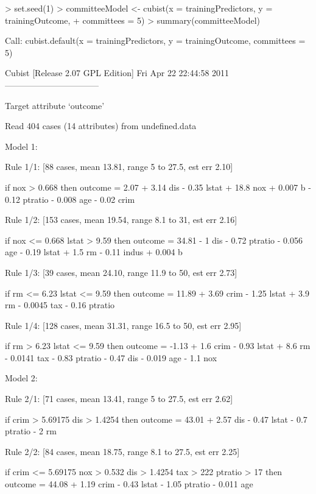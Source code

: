 \documentclass[12pt]{article}
\renewenvironment{Schunk}{\vspace{\topsep}}{\vspace{\topsep}}
\begin{document}
\begin{Schunk}
\begin{Sinput}
> set.seed(1)
> committeeModel <- cubist(x = trainingPredictors, y = trainingOutcome,
+                          committees = 5)
> summary(committeeModel)
\end{Sinput}
\begin{Soutput}
Call:
cubist.default(x = trainingPredictors, y = trainingOutcome, committees = 5)


Cubist [Release 2.07 GPL Edition]  Fri Apr 22 22:44:58 2011
---------------------------------

    Target attribute `outcome'

Read 404 cases (14 attributes) from undefined.data

Model 1:

  Rule 1/1: [88 cases, mean 13.81, range 5 to 27.5, est err 2.10]

    if
	nox > 0.668
    then
	outcome = 2.07 + 3.14 dis - 0.35 lstat + 18.8 nox + 0.007 b
	          - 0.12 ptratio - 0.008 age - 0.02 crim

  Rule 1/2: [153 cases, mean 19.54, range 8.1 to 31, est err 2.16]

    if
	nox <= 0.668
	lstat > 9.59
    then
	outcome = 34.81 - 1 dis - 0.72 ptratio - 0.056 age - 0.19 lstat + 1.5 rm
	          - 0.11 indus + 0.004 b

  Rule 1/3: [39 cases, mean 24.10, range 11.9 to 50, est err 2.73]

    if
	rm <= 6.23
	lstat <= 9.59
    then
	outcome = 11.89 + 3.69 crim - 1.25 lstat + 3.9 rm - 0.0045 tax
	          - 0.16 ptratio

  Rule 1/4: [128 cases, mean 31.31, range 16.5 to 50, est err 2.95]

    if
	rm > 6.23
	lstat <= 9.59
    then
	outcome = -1.13 + 1.6 crim - 0.93 lstat + 8.6 rm - 0.0141 tax
	          - 0.83 ptratio - 0.47 dis - 0.019 age - 1.1 nox

Model 2:

  Rule 2/1: [71 cases, mean 13.41, range 5 to 27.5, est err 2.62]

    if
	crim > 5.69175
	dis > 1.4254
    then
	outcome = 43.01 + 2.57 dis - 0.47 lstat - 0.7 ptratio - 2 rm

  Rule 2/2: [84 cases, mean 18.75, range 8.1 to 27.5, est err 2.25]

    if
	crim <= 5.69175
	nox > 0.532
	dis > 1.4254
	tax > 222
	ptratio > 17
    then
	outcome = 44.08 + 1.19 crim - 0.43 lstat - 1.05 ptratio - 0.011 age


\end{Soutput}
\end{Schunk}
\end{document}
